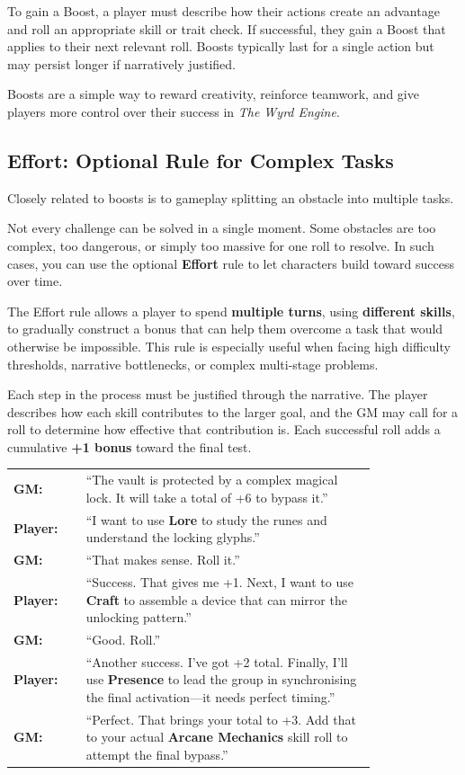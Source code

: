 \begin{multicols}{2}
To gain a Boost, a player must describe how their actions create an advantage and roll an appropriate skill or trait check. If successful, they gain a Boost that applies to their next relevant roll. Boosts typically last for a single action but may persist longer if narratively justified.  

Boosts are a simple way to reward creativity, reinforce teamwork, and give players more control over their success in \textit{The Wyrd Engine}.

\subsection{Effort: Optional Rule for Complex Tasks}

Closely related to boosts is to gameplay splitting an obstacle into multiple tasks.

Not every challenge can be solved in a single moment. Some obstacles are too complex, too dangerous, or simply too massive for one roll to resolve. In such cases, you can use the optional \textbf{Effort} rule to let characters build toward success over time.

The Effort rule allows a player to spend \textbf{multiple turns}, using \textbf{different skills}, to gradually construct a bonus that can help them overcome a task that would otherwise be impossible. This rule is especially useful when facing high difficulty thresholds, narrative bottlenecks, or complex multi-stage problems.

Each step in the process must be justified through the narrative. The player describes how each skill contributes to the larger goal, and the GM may call for a roll to determine how effective that contribution is. Each successful roll adds a cumulative \textbf{+1 bonus} toward the final test.

\begin{Example}
    \begin{tabular}{@{}l p{0.8\linewidth}@{}}
        \textbf{GM:} & “The vault is protected by a complex magical lock. It will take a total of +6 to bypass it.” \\
        \textbf{Player:} & “I want to use \textbf{Lore} to study the runes and understand the locking glyphs.” \\
        \textbf{GM:} & “That makes sense. Roll it.” \\
        \textbf{Player:} & “Success. That gives me +1. Next, I want to use \textbf{Craft} to assemble a device that can mirror the unlocking pattern.” \\
        \textbf{GM:} & “Good. Roll.” \\
        \textbf{Player:} & “Another success. I’ve got +2 total. Finally, I’ll use \textbf{Presence} to lead the group in synchronising the final activation—it needs perfect timing.” \\
        \textbf{GM:} & “Perfect. That brings your total to +3. Add that to your actual \textbf{Arcane Mechanics} skill roll to attempt the final bypass.”
    \end{tabular}
\end{Example}


\end{multicols}
